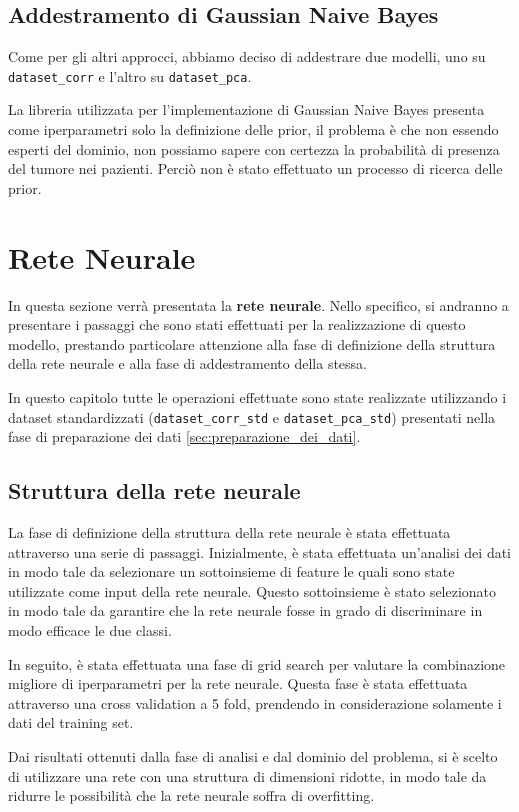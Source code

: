\subsection{Addestramento di Gaussian Naive Bayes}
Come per gli altri approcci, abbiamo deciso di addestrare due modelli, uno su
\texttt{dataset\_corr} e l'altro su \texttt{dataset\_pca}.

La libreria utilizzata per l'implementazione di Gaussian Naive Bayes
presenta come iperparametri solo la definizione delle prior, il problema è che non
essendo esperti del dominio, non possiamo sapere con certezza la probabilità 
di presenza del tumore nei pazienti. Perciò non è stato effettuato un processo di 
ricerca delle prior.

\section{Rete Neurale}
In questa sezione verrà presentata la \textbf{rete neurale}. Nello specifico, si
andranno a presentare i passaggi che sono stati effettuati per la realizzazione
di questo modello, prestando particolare attenzione alla fase di definizione
della struttura della rete neurale e alla fase di addestramento della stessa.

In questo capitolo tutte le operazioni effettuate sono state realizzate
utilizzando i dataset standardizzati (\texttt{dataset\_corr\_std} e
\texttt{dataset\_pca\_std}) presentati nella fase di preparazione dei
dati \ref{sec:preparazione_dei_dati}.
\subsection{Struttura della rete neurale}
La fase di definizione della struttura della rete neurale è stata effettuata
attraverso una serie di passaggi. Inizialmente, è stata effettuata un'analisi
dei dati in modo tale da selezionare un sottoinsieme di feature le quali sono
state utilizzate come input della rete neurale. Questo sottoinsieme è stato
selezionato in modo tale da garantire che la rete neurale fosse in grado di
discriminare in modo efficace le due classi.

In seguito, è stata effettuata una fase di grid search per valutare la combinazione
migliore di iperparametri per la rete neurale. Questa fase è stata effettuata
attraverso una cross validation a 5 fold, prendendo in considerazione solamente
i dati del training set.

Dai risultati ottenuti dalla fase di analisi e dal dominio del problema, si è
scelto di utilizzare una rete con una struttura di dimensioni ridotte, in modo
tale da ridurre le possibilità che la rete neurale soffra di overfitting.

